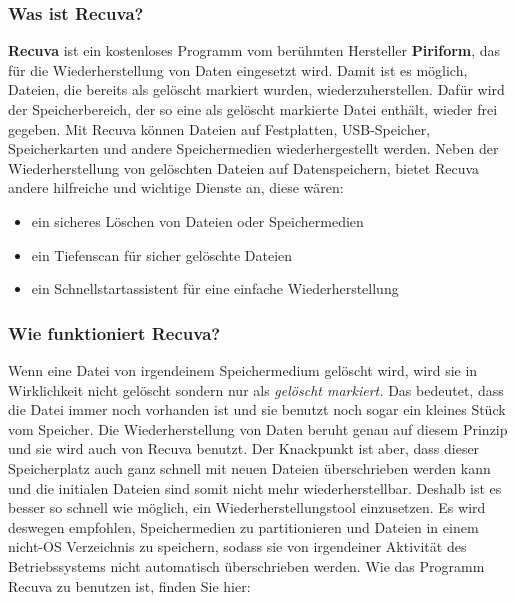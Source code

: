 \documentclass[10pt,a4paper]{article} %
\begin{document}
\subsubsection{Was ist Recuva?}
\textbf{Recuva} ist ein kostenloses Programm vom berühmten Hersteller \textbf{Piriform}, das für die Wiederherstellung von Daten eingesetzt wird. Damit ist es möglich, Dateien, die bereits als gelöscht markiert wurden, wiederzuherstellen. Dafür wird der Speicherbereich, der so eine als gelöscht markierte Datei enthält, wieder frei gegeben. Mit Recuva können Dateien auf Festplatten, USB-Speicher, Speicherkarten und andere Speichermedien wiederhergestellt werden. \newline
Neben der Wiederherstellung von gelöschten Dateien auf Datenspeichern, bietet Recuva andere hilfreiche und wichtige Dienste an, diese wären:
\begin{itemize}
\item
ein sicheres Löschen von Dateien oder Speichermedien
\item
ein Tiefenscan für sicher gelöschte Dateien
\item
ein Schnellstartassistent für eine einfache Wiederherstellung
\end{itemize}
\subsubsection{Wie funktioniert Recuva?}
Wenn eine Datei von irgendeinem Speichermedium gelöscht wird, wird sie in Wirklichkeit nicht gelöscht sondern nur als \textit{gelöscht markiert.} Das bedeutet, dass die Datei immer noch vorhanden ist und sie benutzt noch sogar ein kleines Stück vom Speicher.\newline \newline
Die Wiederherstellung von Daten beruht genau auf diesem Prinzip und sie wird auch von Recuva benutzt. 
Der Knackpunkt ist aber, dass dieser Speicherplatz auch ganz schnell mit neuen Dateien überschrieben werden kann und die initialen Dateien sind somit nicht mehr wiederherstellbar. Deshalb ist es besser so schnell wie möglich, ein Wiederherstellungstool einzusetzen.\newline \newline
Es wird deswegen empfohlen, Speichermedien zu partitionieren und Dateien in einem nicht-OS Verzeichnis zu speichern, sodass sie von irgendeiner Aktivität des Betriebssystems nicht automatisch überschrieben werden.\newline \newline
Wie das Programm Recuva zu benutzen ist, finden Sie hier: \cite{Recuva} 
\end{document}

